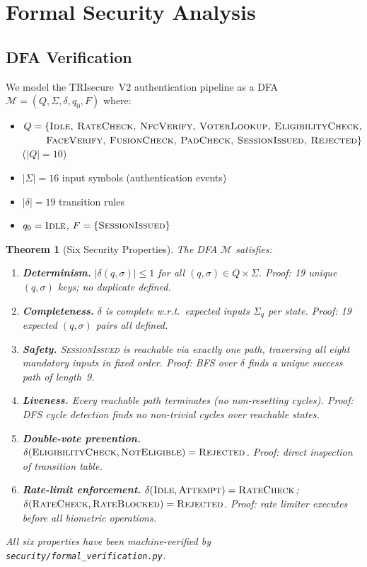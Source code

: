 \documentclass[pdflatex,sn-mathphys-num]{sn-jnl}%
\theoremstyle{thmstyleone}%
\newtheorem{theorem}{Theorem}%
\theoremstyle{thmstyletwo}%
\theoremstyle{thmstylethree}%
\begin{document}
\section{Formal Security Analysis}\label{sec:security}

\subsection{DFA Verification}\label{sec:dfa}

We model the TRIsecure~V2 authentication pipeline as a DFA
$\mathcal{M} = (Q, \Sigma, \delta, q_0, F)$ where:

\begin{itemize}
  \item $Q = \{\textsc{Idle, RateCheck, NfcVerify, VoterLookup, EligibilityCheck,}$\\
    $\quad\quad\;\textsc{FaceVerify, FusionCheck, PadCheck, SessionIssued, Rejected}\}$
    ($|Q|=10$)
  \item $|\Sigma| = 16$ input symbols (authentication events)
  \item $|\delta| = 19$ transition rules
  \item $q_0 = \textsc{Idle}$, $F = \{\textsc{SessionIssued}\}$
\end{itemize}

\begin{theorem}[Six Security Properties]
The DFA $\mathcal{M}$ satisfies:
\begin{enumerate}[label=P\arabic*.]
  \item \textbf{Determinism.} $|\delta(q,\sigma)| \leq 1$ for all $(q,\sigma) \in Q \times \Sigma$.
    \textit{Proof: 19 unique $(q,\sigma)$ keys; no duplicate defined.}
  \item \textbf{Completeness.} $\delta$ is complete w.r.t.\ expected inputs $\Sigma_q$ per state.
    \textit{Proof: 19 expected $(q,\sigma)$ pairs all defined.}
  \item \textbf{Safety.} \textsc{SessionIssued} is reachable via exactly one path, traversing
    all eight mandatory inputs in fixed order.
    \textit{Proof: BFS over $\delta$ finds a unique success path of length~9.}
  \item \textbf{Liveness.} Every reachable path terminates (no non-resetting cycles).
    \textit{Proof: DFS cycle detection finds no non-trivial cycles over reachable states.}
  \item \textbf{Double-vote prevention.} $\delta(\textsc{EligibilityCheck}, \textsc{NotEligible}) = \textsc{Rejected}$.
    \textit{Proof: direct inspection of transition table.}
  \item \textbf{Rate-limit enforcement.} $\delta(\textsc{Idle}, \textsc{Attempt}) = \textsc{RateCheck}$;
    $\delta(\textsc{RateCheck}, \textsc{RateBlocked}) = \textsc{Rejected}$.
    \textit{Proof: rate limiter executes before all biometric operations.}
\end{enumerate}
All six properties have been machine-verified by \texttt{security/formal\_verification.py}.
\end{theorem}
\end{document}
